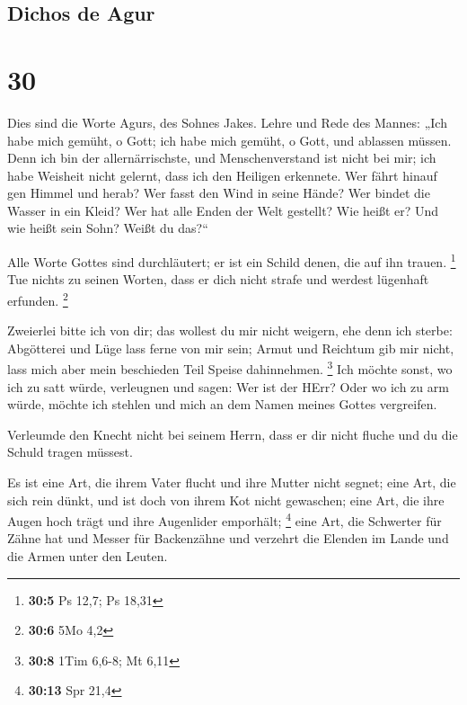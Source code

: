 \hypertarget{dichos-de-agur}{%
\subsection{Dichos de Agur}\label{dichos-de-agur}}

\hypertarget{section-29}{%
\section{30}\label{section-29}}

 Dies sind die Worte Agurs, des Sohnes Jakes. Lehre und
Rede des Mannes: „Ich habe mich gemüht, o Gott; ich habe mich gemüht, o
Gott, und ablassen müssen.  Denn ich bin der
allernärrischste, und Menschenverstand ist nicht bei mir; 
ich habe Weisheit nicht gelernt, dass ich den Heiligen erkennete.
 Wer fährt hinauf gen Himmel und herab? Wer fasst den Wind
in seine Hände? Wer bindet die Wasser in ein Kleid? Wer hat alle Enden
der Welt gestellt? Wie heißt er? Und wie heißt sein Sohn? Weißt du
das?{}``

 Alle Worte Gottes sind durchläutert; er ist ein Schild
denen, die auf ihn trauen. \footnote{\textbf{30:5} Ps 12,7; Ps 18,31}
 Tue nichts zu seinen Worten, dass er dich nicht strafe
und werdest lügenhaft erfunden. \footnote{\textbf{30:6} 5Mo 4,2}

 Zweierlei bitte ich von dir; das wollest du mir nicht
weigern, ehe denn ich sterbe:  Abgötterei und Lüge lass
ferne von mir sein; Armut und Reichtum gib mir nicht, lass mich aber
mein beschieden Teil Speise dahinnehmen. \footnote{\textbf{30:8} 1Tim
  6,6-8; Mt 6,11}  Ich möchte sonst, wo ich zu satt würde,
verleugnen und sagen: Wer ist der HErr? Oder wo ich zu arm würde, möchte
ich stehlen und mich an dem Namen meines Gottes vergreifen.

 Verleumde den Knecht nicht bei seinem Herrn, dass er dir
nicht fluche und du die Schuld tragen müssest.

 Es ist eine Art, die ihrem Vater flucht und ihre Mutter
nicht segnet;  eine Art, die sich rein dünkt, und ist
doch von ihrem Kot nicht gewaschen;  eine Art, die ihre
Augen hoch trägt und ihre Augenlider emporhält; \footnote{\textbf{30:13}
  Spr 21,4}  eine Art, die Schwerter für Zähne hat und
Messer für Backenzähne und verzehrt die Elenden im Lande und die Armen
unter den Leuten.

